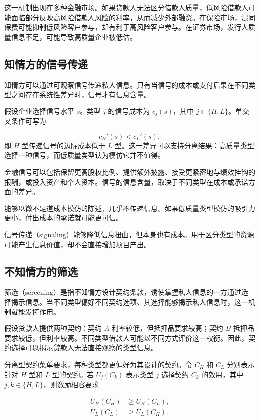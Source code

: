 这一机制出现在多种金融市场。如果贷款人无法区分借款人质量，低风险借款人可能面临部分反映高风险借款人风险的利率，从而减少外部融资。在保险市场，混同保费可能抑制低风险客户参与，却有利于高风险客户参与。在证券市场，发行人质量信息不足，可能导致高质量企业被低估。

\subsection{知情方的信号传递}

知情方可以通过可观察信号传递私人信息。只有当信号的成本或支付后果在不同类型之间存在系统性差异时，信号才有信息含量。

假设企业选择信号水平 $s$。类型 $j$ 的信号成本为 $c_j(s)$，其中 $j\in\{H,L\}$。单交叉条件可写为

\begin{equation}
c_H'(s)<c_L'(s),
\label{eq:ch3-single-crossing}
\end{equation}
即 $H$ 型传递信号的边际成本低于 $L$ 型。这一差异可以支持分离结果：高质量类型选择一种信号，而低质量类型认为模仿它并不值得。

金融信号可以包括保留更高股权比例、提供额外披露、接受更紧密地与绩效挂钩的报酬，或投入资产和个人资本。信号的信息含量，取决于不同类型在成本或承诺方面的差异。

能够以微不足道成本模仿的陈述，几乎不传递信息。如果低质量类型模仿的吸引力更小，付出成本的承诺就可能更可信。

信号传递（signaling）能够降低信息扭曲，但本身也有成本。用于区分类型的资源可能产生信息价值，却不会直接增加项目产出。

\subsection{不知情方的筛选}

筛选（screening）是指不知情方设计契约条款，诱使掌握私人信息的一方通过选择揭示信息。当不同类型偏好不同契约选项、其选择能够揭示私人信息时，这一机制就能发挥作用。

假设贷款人提供两种契约：契约 $A$ 利率较低，但抵押品要求较高；契约 $B$ 抵押品要求较低，但利率较高。不同类型借款人可能以不同方式评价这一权衡。因此，契约选择可以揭示贷款人无法直接观察的类型信息。

分离型契约菜单要求，每种类型都更偏好为其设计的契约。令 $C_H$ 和 $C_L$ 分别表示针对 $H$ 型和 $L$ 型的契约。若 $U_j(C_k)$ 表示类型 $j$ 选择契约 $C_k$ 的效用，其中 $j,k\in\{H,L\}$，则激励相容要求

\begin{equation}
\begin{aligned}
U_H(C_H) &\geq U_H(C_L),\\
U_L(C_L) &\geq U_L(C_H).
\end{aligned}
\label{eq:ch3-screening-ic}
\end{equation}

